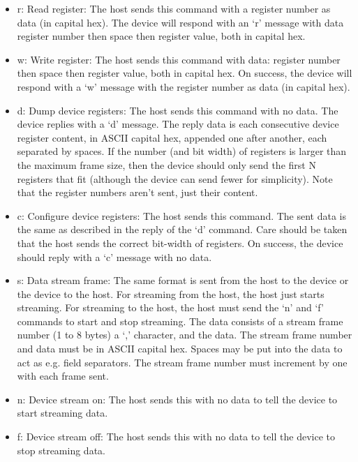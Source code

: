 \documentclass{customdocclass}
\begin{document}
\begin{itemize}
  \item r: Read register: The host sends this command with a register number as data (in capital hex). The device will respond with an `r' message with data register number then space then register value, both in capital hex.
  \item w: Write register: The host sends this command with data: register number then space then register value, both in capital hex. On success, the device will respond with a `w' message with the register number as data (in capital hex).
  \item d: Dump device registers: The host sends this command with no data. The device replies with a `d' message. The reply data is each consecutive device register content, in ASCII capital hex, appended one after another, each separated by spaces. If the number (and bit width) of registers is larger than the maximum frame size, then the device should only send the first N registers that fit (although the device can send fewer for simplicity). Note that the register numbers aren't sent, just their content.
  \item c: Configure device registers: The host sends this command. The sent data is the same as described in the reply of the `d' command. Care should be taken that the host sends the correct bit-width of registers. On success, the device should reply with a `c' message with no data.
  \item s: Data stream frame: The same format is sent from the host to the device or the device to the host. For streaming from the host, the host just starts streaming. For streaming to the host, the host must send the `n' and `f' commands to start and stop streaming. The data consists of a stream frame number (1 to 8 bytes) a `,' character, and the data. The stream frame number and data must be in ASCII capital hex. Spaces may be put into the data to act as e.g. field separators. The stream frame number must increment by one with each frame sent.
  \item n: Device stream on: The host sends this with no data to tell the device to start streaming data.
  \item f: Device stream off: The host sends this with no data to tell the device to stop streaming data.
\end{itemize}
\end{document}
